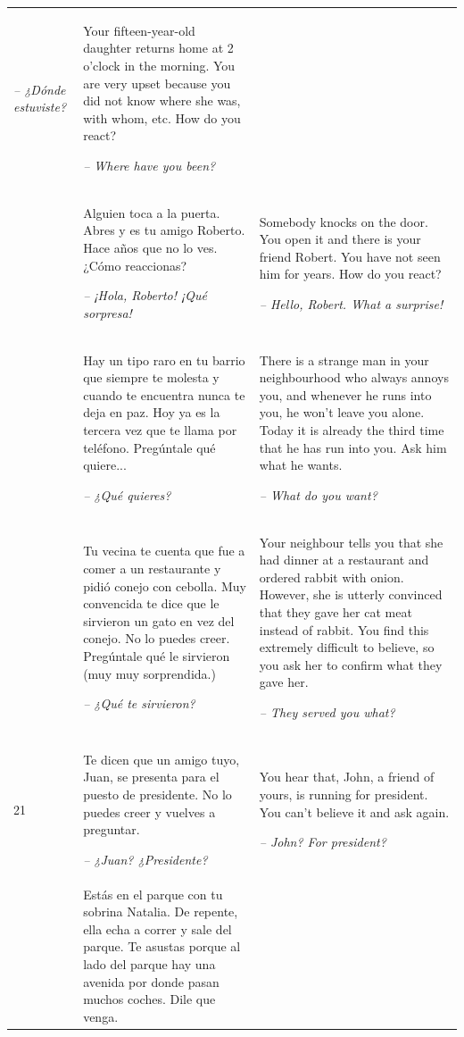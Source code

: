\begin{xltabular}{\textwidth}{lQQ}
\textit{-- ¿Dónde estuviste?} & Your fifteen-year-old daughter returns home at 2 o’clock in the morning. You are very upset because you did not know where she was, with whom, etc. How do you react?

{\itshape -- Where have you been?}\\
 & Alguien toca a la puerta. Abres y es tu amigo Roberto. Hace años que no lo ves. ¿Cómo reaccionas?

\textit{-- ¡Hola, Roberto! ¡Qué sorpresa!} & Somebody knocks on the door. You open it and there is your friend Robert. You have not seen him for years. How do you react?

{\itshape -- Hello, Robert. What a surprise!}\\
 & Hay un tipo raro en tu barrio que siempre te molesta y cuando te encuentra nunca te deja en paz. Hoy ya es la tercera vez que te llama por teléfono. Pregúntale qué quiere...

\textit{-- ¿Qué quieres?} & There is a strange man in your neighbourhood who always annoys you, and whenever he runs into you, he won’t leave you alone. Today it is already the third time that he has run into you. Ask him what he wants.

{\itshape -- What do you want?}\\
 & Tu vecina te cuenta que fue a comer a un restaurante y pidió conejo con cebolla. Muy convencida te dice que le sirvieron un gato en vez del conejo. No lo puedes creer. Pregúntale qué le sirvieron (muy muy sorprendida.)

\textit{-- ¿Qué te sirvieron?} & Your neighbour tells you that she had dinner at a restaurant and ordered rabbit with onion. However, she is utterly convinced that they gave her cat meat instead of rabbit. You find this extremely difficult to believe, so you ask her to confirm what they gave her.

{\itshape -- They served you what?}\\
21 & Te dicen que un amigo tuyo, Juan, se presenta para el puesto de presidente. No lo puedes creer y vuelves a preguntar.

\textit{-- ¿Juan? ¿Presidente?} & You hear that, John, a friend of yours, is running for president. You can’t believe it and ask again.

{\itshape -- John? For president?}\\
 & Estás en el parque con tu sobrina Natalia. De repente, ella echa a correr y sale del parque. Te asustas porque al lado del parque hay una avenida por donde pasan muchos coches. Dile que venga.


\end{xltabular}
